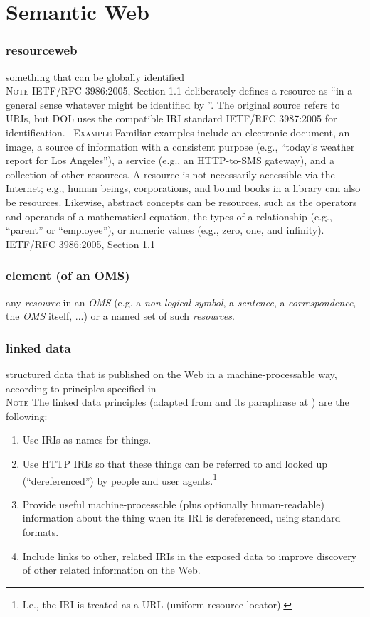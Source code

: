 \documentclass[10pt,%
\ifpretendfinal
final%
\else
draft%
\fi,
]{scrreprt}
\makeatletter
\newcommand*{\eg}{e.g.\@\xspace}
\newcommand*{\termref}[1]{\textit{#1}}
\newcommand*{\subjectfield}[1]{ {\textlangle}#1{\textrangle}}
\newcommand{\sclause}[1]{\section{#1}}
\newcommand{\termdefinition}[2]{\subsubsection*{\normalsize #1}#2}
\newcommand{\nisref}[1]{#1}
\renewcommand{\subjectfield}[1]{#1}
\newenvironment{definitions}[0]{\medskip }{}
\newenvironment{note}[0]{\ \\ \textsc{Note} \quad}{}
\newenvironment{example}[0]{\ \newline \textsc{Example}\quad }{}
\makeatother
\begin{document}
\sclause{Semantic Web}\label{c:terms-semantic-web}

\begin{definitions}
  \termdefinition{resource\subjectfield{web}}{something that can be globally identified}
  \begin{note}
    \nisref{IETF/RFC 3986:2005, Section 1.1} deliberately defines a resource as ``in a general sense \textelp{} whatever might be identified by ''.  The original source refers to URIs, but DOL uses the compatible IRI standard \nisref{IETF/RFC 3987:2005} for identification.
  \end{note}
  \begin{example}
    Familiar examples include an electronic document, an image, a source of information with a consistent purpose (\eg, ``today's weather report for Los Angeles''), a service (\eg, an HTTP-to-SMS gateway), and a collection of other resources. A resource is not necessarily accessible via the Internet; \eg, human beings, corporations, and bound books in a library can also be resources. Likewise, abstract concepts can be resources, such as the operators and operands of a mathematical equation, the types of a relationship (\eg, ``parent'' or ``employee''), or numeric values (\eg, zero, one, and infinity). \nisref{IETF/RFC 3986:2005, Section 1.1}
  \end{example}
  \termdefinition{element (of an OMS)}{any \termref{resource} in an \termref{OMS} (\eg a \termref{non-logical symbol}, a \termref{sentence}, a \termref{correspondence}, the \termref{OMS} itself, ...) or a named set of such \termref{resources}.}
  
  \termdefinition{linked data}{structured data that is published on the Web in a machine-processable way, according to principles specified in \cite{BernersLee:LinkedData2006,BizerHeath09}}
  \begin{note}
    The linked data principles (adapted from \cite{BernersLee:LinkedData2006} and its paraphrase at \cite{Wikipedia:LinkedData2011}) are the following:
    \begin{enumerate}
    \item Use IRIs as names for things.
    \item Use HTTP IRIs so that these things can be referred to and looked up (``dereferenced'') by people and user agents.\footnote{I.e., the IRI is treated as a URL (uniform resource locator).}
    \item Provide useful machine-processable (plus optionally human-readable) information about the thing when its IRI is dereferenced, using standard formats.
    \item Include links to other, related IRIs in the exposed data to improve discovery of other related information on the Web.
    \end{enumerate}
  \end{note}


\end{definitions}
\end{document}
